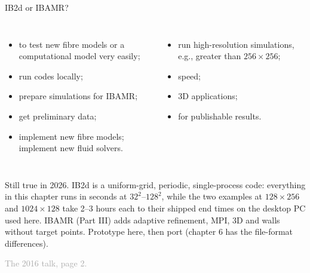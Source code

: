\documentclass[aspectratio=169,11pt]{beamer}
\newcommand{\sourcecredit}[1]{\vfill\hfill{\tiny\textcolor{DarkGray}{#1}}}
\begin{document}
\begin{frame}{IB2d or IBAMR?}
\label{fr:which}
\begin{columns}[T]
\small
{}
\begin{itemize}
  \item to test new fibre models or a computational model very easily;
  \item run codes locally;
  \item prepare simulations for IBAMR;
  \item get preliminary data;
  \item implement new fibre models; implement new fluid solvers.
\end{itemize}
\small
{}
\begin{itemize}
  \item run high-resolution simulations, e.g., greater than $256 \times 256$;
  \item speed;
  \item 3D applications;
  \item for publishable results.
\end{itemize}
\end{columns}
\vspace{2mm}
\begin{punchbox}
\small Still true in 2026. IB2d is a uniform-grid, periodic, single-process code: everything in this chapter runs in seconds at $32^2$--$128^2$, while the two examples at $128 \times 256$ and $1024 \times 128$ take 2--3 hours each to their shipped end times on the desktop PC used here. IBAMR (Part III) adds adaptive refinement, MPI, 3D and walls without target points. Prototype here, then port (chapter 6 has the file-format differences).
\end{punchbox}
\sourcecredit{The 2016 talk, page 2.}
\end{frame}
\end{document}
